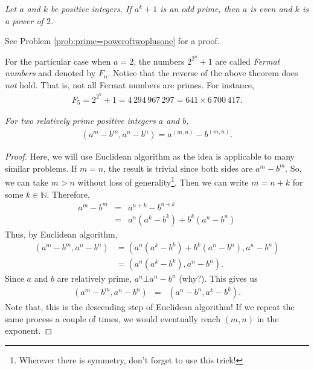 \documentclass{subfile}
\begin{document}
	\begin{theorem}\slshape\label{thm:primec}
		Let $a$ and $k$ be positive integers. If $a^k+1$ is an odd prime, then $a$ is even and $k$ is a power of $2$.
	\end{theorem}

	See Problem \ref{prob:prime=poweroftwoplusone} for a proof.

	\begin{remark}
		For the particular case when $a=2$, the numbers $2^{2^n}+1$ are called \textit{Fermat numbers} and denoted by $F_n$. Notice that the reverse of the above theorem does \textit{not} hold. That is, not all Fermat numbers are primes. For instance,
		\begin{align*}
			F_5 = 2^{2^5}+1 = 4\, 294\, 967\, 297 = 641 \times 6\, 700\, 417.
		\end{align*}
	\end{remark}

	\begin{theorem}\slshape
		For two relatively prime positive integers $a$ and $b$,
		\begin{align*}
			(a^m-b^m,a^n-b^n)=a^{(m,n)}-b^{(m,n)}.
		\end{align*}
	\end{theorem}

	\begin{proof}
		Here, we will use Euclidean algorithm as the idea is applicable to many similar problems. If $m=n$, the result is trivial since both sides are $a^m-b^m$. So, we can take $m>n$ without loss of generality\footnote{Wherever there is symmetry, don't forget to use this trick!}. Then we can write $m=n+k$ for some $k\in\mathbb{N}$. Therefore,
		\begin{eqnarray*}
			a^m-b^m & = & a^{n+k}-b^{n+k}\\
			& = & a^n(a^k-b^k)+b^k(a^n-b^n)
		\end{eqnarray*}
		Thus, by Euclidean algorithm,
		\begin{align*}
			(a^m-b^m,a^n-b^n) & = (a^n(a^k-b^k)+b^k(a^n-b^n),a^n-b^n)\\
			&=(a^n(a^k-b^k),a^n-b^n).
		\end{align*}
		Since $a$ and $b$ are relatively prime, $a^n\bot a^n-b^n$ (why?). This gives us
		\begin{eqnarray*}
			(a^m-b^m,a^n-b^n) & = & (a^n-b^n,a^k-b^k).
		\end{eqnarray*}
		Note that, this is the descending step of Euclidean algorithm! If we repeat the same process a couple of times, we would eventually reach $(m,n)$ in the exponent.
	\end{proof}
\end{document}
